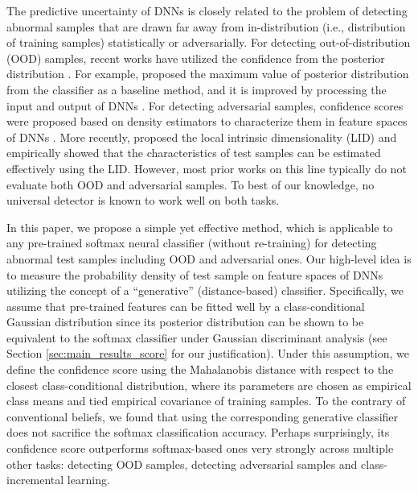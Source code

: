 \documentclass{article}
\begin{document}
The predictive uncertainty of DNNs is closely related to the problem of detecting abnormal samples
that are drawn far away from in-distribution (i.e., distribution of training samples) statistically or adversarially.
For detecting out-of-distribution (OOD) samples,
recent works have utilized the confidence from the posterior distribution \citep{hendrycks2016baseline, liang2017principled}.
For example, \citet{hendrycks2016baseline} proposed the maximum value of posterior distribution from the classifier as a baseline method, and it is improved by processing the input and output of DNNs \citep{liang2017principled}. 
For detecting adversarial samples,
confidence scores were proposed 
based on density estimators to characterize them in feature spaces of DNNs \citep{feinman2017detecting}.
More recently, \citet{ma2018characterizing} proposed the local intrinsic dimensionality (LID) and empirically showed that the characteristics of test samples can be estimated effectively using the LID.
However, most prior works on this line typically do not evaluate both OOD and adversarial samples.
To best of our knowledge, no universal detector is known to work well on both tasks.

In this paper, we propose a simple yet effective method, which is applicable to 
any pre-trained softmax neural classifier (without re-training) for detecting
abnormal test samples including OOD and adversarial ones.
Our high-level idea is to measure the probability density of test sample on feature spaces of DNNs utilizing the concept of a ``generative'' (distance-based) classifier. Specifically, 
we assume that pre-trained features can be fitted well by a class-conditional Gaussian distribution
since its posterior distribution can be shown to be equivalent to the softmax classifier under Gaussian discriminant analysis (see Section \ref{sec:main_results_score} for our justification). 
Under this assumption, 
we define the confidence score using the Mahalanobis distance with respect to the closest class-conditional distribution, where its parameters are chosen as empirical class means and tied empirical covariance of training samples.
To the contrary of conventional beliefs, we found that using the corresponding generative classifier does not sacrifice the softmax classification accuracy.
Perhaps surprisingly, its confidence score
outperforms softmax-based ones very strongly across multiple other tasks: detecting OOD samples, detecting adversarial samples and class-incremental learning.
\end{document}
